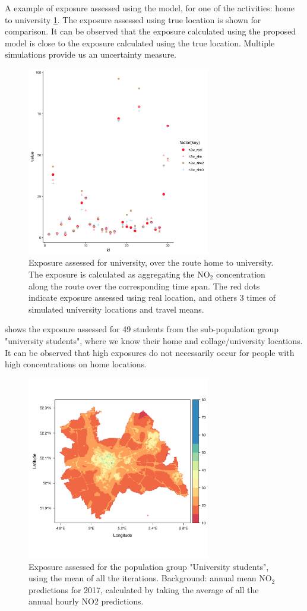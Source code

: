 \documentclass[]{article}
\begin{document}
A example of exposure assessed using the model, for one of the activities: home to university \cref{sims}. The exposure assessed using true location is shown for comparison. It can be observed that the exposure calculated using the proposed model is close to the exposure calculated using the true location. Multiple simulations provide us an uncertainty measure.  
\begin{figure}[h]
    \centering
    \includegraphics[width=8cm]{figure/sims.png}
    \caption{Exposure assessed for university, over the route home to university. The exposure is calculated as aggregating the NO$_2$ concentration along the route over the corresponding time span. The red dots indicate exposure assessed using real location, and others 3 times of simulated university locations and travel means.}
    \label{sims}
\end{figure}


 shows the exposure assessed for 49 students from the sub-population group "university students", where we know their home and collage/university locations. It can be observed that high exposures do not necessarily occur for people with high concentrations on home locations.
\begin{figure}[h]
    \centering
    \includegraphics[width=8cm]{figure/utschoolmean2.pdf}
    \caption{Exposure assessed for the population group "University students", using the mean of all the iterations.  Background: annual mean NO$_2$ predictions for 2017, calculated by taking the average of all the annual hourly NO2 predictions.}
    \label{expmap}
\end{figure}
\end{document}
